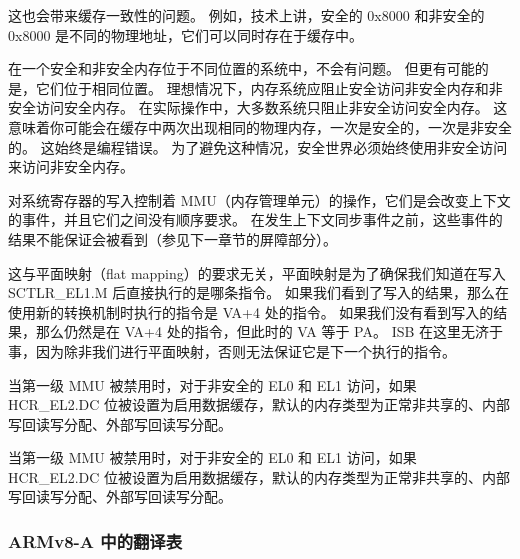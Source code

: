 
这也会带来缓存一致性的问题。
例如，技术上讲，安全的 0x8000 和非安全的 0x8000 是不同的物理地址，它们可以同时存在于缓存中。

在一个安全和非安全内存位于不同位置的系统中，不会有问题。
但更有可能的是，它们位于相同位置。
理想情况下，内存系统应阻止安全访问非安全内存和非安全访问安全内存。
在实际操作中，大多数系统只阻止非安全访问安全内存。
这意味着你可能会在缓存中两次出现相同的物理内存，一次是安全的，一次是非安全的。
这始终是编程错误。
为了避免这种情况，安全世界必须始终使用非安全访问来访问非安全内存。


对系统寄存器的写入控制着 MMU（内存管理单元）的操作，它们是会改变上下文的事件，并且它们之间没有顺序要求。
在发生上下文同步事件之前，这些事件的结果不能保证会被看到（参见下一章节的屏障部分）。


这与平面映射（flat mapping）的要求无关，平面映射是为了确保我们知道在写入 SCTLR\_EL1.M 后直接执行的是哪条指令。
如果我们看到了写入的结果，那么在使用新的转换机制时执行的指令是 VA+4 处的指令。
如果我们没有看到写入的结果，那么仍然是在 VA+4 处的指令，但此时的 VA 等于 PA。
ISB 在这里无济于事，因为除非我们进行平面映射，否则无法保证它是下一个执行的指令。

当第一级 MMU 被禁用时，对于非安全的 EL0 和 EL1 访问，如果 HCR\_EL2.DC 位被设置为启用数据缓存，默认的内存类型为正常非共享的、内部写回读写分配、外部写回读写分配。


当第一级 MMU 被禁用时，对于非安全的 EL0 和 EL1 访问，如果 HCR\_EL2.DC 位被设置为启用数据缓存，默认的内存类型为正常非共享的、内部写回读写分配、外部写回读写分配。

\subsubsection{ARMv8-A 中的翻译表}

